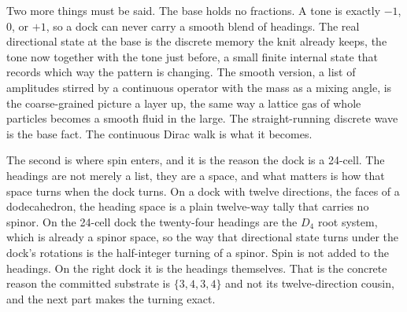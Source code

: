 Two more things must be said. The base holds no fractions. A tone is exactly $-1$, $0$, or $+1$, so a dock can never carry a smooth blend of headings. The real directional state at the base is the discrete memory the knit already keeps, the tone now together with the tone just before, a small finite internal state that records which way the pattern is changing. The smooth version, a list of amplitudes stirred by a continuous operator with the mass as a mixing angle, is the coarse-grained picture a layer up, the same way a lattice gas of whole particles becomes a smooth fluid in the large. The straight-running discrete wave is the base fact. The continuous Dirac walk is what it becomes.

The second is where spin enters, and it is the reason the dock is a 24-cell. The headings are not merely a list, they are a space, and what matters is how that space turns when the dock turns. On a dock with twelve directions, the faces of a dodecahedron, the heading space is a plain twelve-way tally that carries no spinor. On the 24-cell dock the twenty-four headings are the $D_4$ root system, which is already a spinor space, so the way that directional state turns under the dock's rotations is the half-integer turning of a spinor. Spin is not added to the headings. On the right dock it is the headings themselves. That is the concrete reason the committed substrate is $\{3,4,3,4\}$ and not its twelve-direction cousin, and the next part makes the turning exact.
